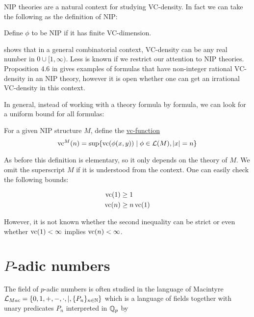 \documentclass{amsart}
\renewcommand{\LL}{\mathcal L}
\newcommand{\LLM}{\mathcal L_{Mac}}
\newcommand{\curly}[1]{\left\{#1\right\}}
\newcommand{\defn}{\underline}
\begin{document}
NIP theories are a natural context for studying VC-density.
In fact we can take the following as the definition of NIP:
\begin{Definition}
  Define $\phi$ to be NIP if it has finite VC-dimension. 
\end{Definition}

\cite{Aschenbrenner_reference_8} shows that in a general combinatorial context,
VC-density can be any real number in $0 \cup [1, \infty)$.
Less is known if we restrict our attention to NIP theories.
Proposition 4.6 in \cite{density} gives examples of formulas that have non-integer rational VC-density in an NIP theory,
however it is open whether one can get an irrational VC-density in this context.

In general, instead of working with a theory formula by formula, we can look for a uniform bound for all formulas:
\begin{Definition}
  For a given NIP structure $M$, define the \defn{vc-function}
  \begin{align*}
    \vc^M(n) = \sup \{\vc(\phi(x, y)) \mid \phi \in \LL(M), |x| = n\}
  \end{align*}
\end{Definition}

As before this definition is elementary, so it only depends on the theory of $M$.
We omit the superscript $M$ if it is understood from the context.
One can easily check the following bounds:
\begin{Lemma} 
  \begin{align*}
    \operatorname{vc}(1) &\geq 1 \\
    \operatorname{vc}(n) &\geq n\operatorname{vc}(1)
  \end{align*}  
\end{Lemma}

However, it is not known whether the second inequality can be strict or even whether $\operatorname{vc}(1) < \infty$ implies $\operatorname{vc}(n) < \infty$.


\section{$P$-adic numbers}


The field of $p$-adic numbers is often studied in the language of Macintyre $\LLM = \curly{0, 1, +, -, \cdot, |, \{P_n\}_{n \in \N}}$
which is a language of fields together with unary predicates $P_n$ interpreted in $\mathbb{Q}_p$ by
\end{document}
